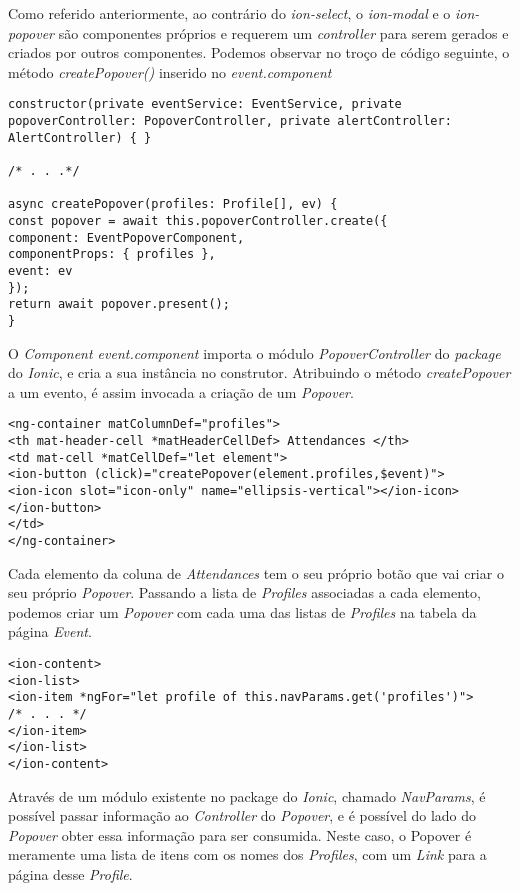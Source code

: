 Como referido anteriormente, ao contrário do \textit{ion-select}, o \textit{ion-modal} e o \textit{ion-popover} são componentes próprios e requerem um \textit{controller} para serem gerados e criados por outros componentes. Podemos observar no troço de código seguinte, o método \textit{createPopover()} inserido no \textit{event.component}

\begin{lstlisting}
constructor(private eventService: EventService, private popoverController: PopoverController, private alertController: AlertController) { }

/* . . .*/

async createPopover(profiles: Profile[], ev) {
const popover = await this.popoverController.create({
component: EventPopoverComponent,
componentProps: { profiles },
event: ev
});
return await popover.present();
}
\end{lstlisting}



O \textit{Component event.component} importa o módulo \textit{PopoverController} do \textit{package} do \textit{Ionic}, e cria a sua instância no construtor. Atribuindo o método \textit{createPopover} a um evento, é assim invocada a criação de um \textit{Popover}. 

\begin{lstlisting}
<ng-container matColumnDef="profiles">
<th mat-header-cell *matHeaderCellDef> Attendances </th>
<td mat-cell *matCellDef="let element">
<ion-button (click)="createPopover(element.profiles,$event)">
<ion-icon slot="icon-only" name="ellipsis-vertical"></ion-icon>
</ion-button>
</td>
</ng-container>
\end{lstlisting}



Cada elemento da coluna de \textit{Attendances} tem o seu próprio botão que vai criar o seu próprio \textit{Popover}. Passando a lista de \textit{Profiles} associadas a cada elemento, podemos criar um \textit{Popover} com cada uma das listas de \textit{Profiles} na tabela da página \textit{Event}.\\

\begin{lstlisting}
<ion-content>
<ion-list>
<ion-item *ngFor="let profile of this.navParams.get('profiles')">
/* . . . */
</ion-item>
</ion-list>
</ion-content>
\end{lstlisting}

Através de um módulo existente no package do \textit{Ionic}, chamado \textit{NavParams}, é possível passar informação ao \textit{Controller} do \textit{Popover}, e é possível do lado do \textit{Popover} obter essa informação para ser consumida. Neste caso, o Popover é meramente uma lista de itens com os nomes dos \textit{Profiles}, com um \textit{Link} para a página desse \textit{Profile}.

